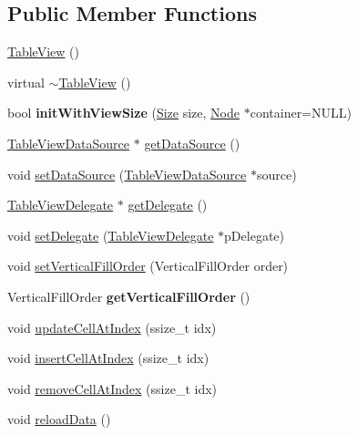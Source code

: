 \subsection*{Public Member Functions}
\begin{DoxyCompactItemize}
\item 
\hyperlink{classTableView_a5af30a8dfb5cc01b5bd2db1ac59e91fd}{Table\+View} ()
\item 
virtual \hyperlink{classTableView_af8ce226b68febf945ee38531c5bd4c47}{$\sim$\+Table\+View} ()
\item 
\mbox{\label{classTableView_a166e7f7de745477be219d3027c0cb234}} 
bool {\bfseries init\+With\+View\+Size} (\hyperlink{classSize}{Size} size, \hyperlink{classNode}{Node} $\ast$container=N\+U\+LL)
\item 
\hyperlink{classTableViewDataSource}{Table\+View\+Data\+Source} $\ast$ \hyperlink{classTableView_aca51ba7a0f81e6e3c80056733665cd5a}{get\+Data\+Source} ()
\item 
void \hyperlink{classTableView_a3871ed3e4b512026027371680dd23159}{set\+Data\+Source} (\hyperlink{classTableViewDataSource}{Table\+View\+Data\+Source} $\ast$source)
\item 
\hyperlink{classTableViewDelegate}{Table\+View\+Delegate} $\ast$ \hyperlink{classTableView_a1530f5f201ca31501a85e27a3b45453f}{get\+Delegate} ()
\item 
void \hyperlink{classTableView_afb2bffdd669f02feb74e2534d477dc1b}{set\+Delegate} (\hyperlink{classTableViewDelegate}{Table\+View\+Delegate} $\ast$p\+Delegate)
\item 
void \hyperlink{classTableView_a687ac9ecccbb967c84322cc69de6336e}{set\+Vertical\+Fill\+Order} (Vertical\+Fill\+Order order)
\item 
\mbox{\label{classTableView_afe70d5c1306fd8c67a39a676ce96b0fa}} 
Vertical\+Fill\+Order {\bfseries get\+Vertical\+Fill\+Order} ()
\item 
void \hyperlink{classTableView_a98a5e4c9b7c7841fb9ecb15604bd3dc5}{update\+Cell\+At\+Index} (ssize\+\_\+t idx)
\item 
void \hyperlink{classTableView_a78419c05170575d818d08809dfab0b2f}{insert\+Cell\+At\+Index} (ssize\+\_\+t idx)
\item 
void \hyperlink{classTableView_afaef50b9df2cc2c3d34bb157d046f73f}{remove\+Cell\+At\+Index} (ssize\+\_\+t idx)
\item 
void \hyperlink{classTableView_ad142e6fbf0bf66d2d27fdb616a8a726c}{reload\+Data} ()

\end{DoxyCompactItemize}
